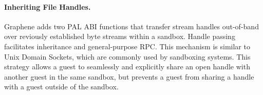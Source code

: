 \paragraph{Inheriting File Handles.}
Graphene adds two PAL ABI functions that transfer 
stream handles out-of-band over reviously 
established byte streams within a sandbox.  Handle passing facilitates inheritance
and general-purpose RPC.
This mechanism is similar to Unix Domain Sockets,
which are commonly used by sandboxing systems. %
This strategy allows a guest to seamlessly and explicitly 
share an open handle with another guest in the same sandbox, but prevents
a guest from sharing a handle with a guest outside of the sandbox.

\begin{comment}
\vspace{5pt}
\noindent{\bf Discussion.~}
A Graphene picoprocess can copy part or all its address space into a child
picoprocess relatively efficiently.
Although this mechanism is less efficient than an in-kernel {\tt fork},
we wanted to maintain the generality benefits of recent \liboses{},
and only added the minimal building blocks to the host ABI.
The transfer of data is explicit to the host, can be mediated by a reference monitor,
the sender, or the receiver.
For instance, recent Unix systems introduced a close-on-exec flag for file handles~\citep{close-on-exec}, 
which prevents inheritance of handles to sensitive files.  This can be implemented
either in a parent, by excluding the file handle from a checkpoint, 
or in the child, by closing this handle on an {\tt exec} call.
Our current implementation implements close-on-exec in the child for complete compatibility,
but a more security-sensitive application could easily implement ``close-on-fork'' semantics 
in the parent.
This clean division of labor retains full functionality
and facilitates extensibility.


\end{comment}
